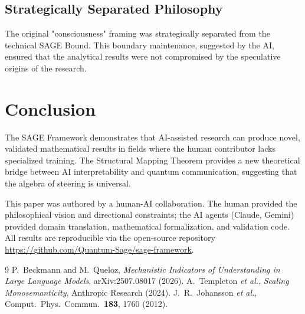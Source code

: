 \documentclass[aps,pra,reprint,amsmath,amssymb,superscriptaddress]{revtex4-2}
\begin{document}
\subsection{Strategically Separated Philosophy}
The original "consciousness" framing was strategically separated from the technical SAGE Bound. This boundary maintenance, suggested by the AI, ensured that the analytical results were not compromised by the speculative origins of the research.


\section{Conclusion}

The SAGE Framework demonstrates that AI-assisted research can produce novel, validated mathematical results in fields where the human contributor lacks specialized training. The Structural Mapping Theorem provides a new theoretical bridge between AI interpretability and quantum communication, suggesting that the algebra of steering is universal.

\begin{acknowledgments}
This paper was authored by a human-AI collaboration. The human provided the philosophical vision and directional constraints; the AI agents (Claude, Gemini) provided domain translation, mathematical formalization, and validation code. All results are reproducible via the open-source repository \url{https://github.com/Quantum-Sage/sage-framework}.
\end{acknowledgments}

\begin{thebibliography}{9}
 P.~Beckmann and M.~Queloz, \emph{Mechanistic Indicators of Understanding in Large Language Models}, arXiv:2507.08017 (2026).
 A.~Templeton \emph{et al.}, \emph{Scaling Monosemanticity}, Anthropic Research (2024).
 J.~R.~Johansson \emph{et al.}, Comput.\ Phys.\ Commun.\ \textbf{183}, 1760 (2012).
\end{thebibliography}
\end{document}
